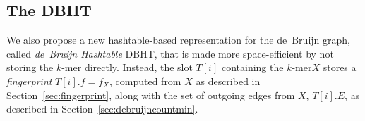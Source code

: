 \documentclass[a4paper,12pt]{article}
\newcommand{\dB}{de~Bruijn\xspace}
\newcommand{\dBG}{de~Bruijn graph\xspace}
\newcommand{\dBCM}{DBCM\xspace}
\newcommand{\dBHT}{DBHT\xspace}
\newcommand{\kmer}{\mbox{$k$-mer}\xspace}
\newcommand{\kmers}{\mbox{$k$-mers}\xspace}
\newcommand{\keyterm}[1]{\textit{#1}\/\xspace}
\newcommand{\strsetname}[1]{\ensuremath{\mathcal{\uppercase{#1}}}}
\begin{document}


\subsection{The DBHT}
\label{sec:debruijnhashtable}

We also propose a new hashtable-based representation for the \dBG, called \keyterm{\dB Hashtable} \dBHT, that is made more space-efficient by not storing the \kmer directly. Instead, the slot $T[i]$ containing the \kmer $X$ stores a \keyterm{fingerprint} $T[i].f = f_X$, computed from $X$ as described in Section~\ref{sec:fingerprint}, along with the set of outgoing edges from $X$, $T[i].E$,  as described in Section~\ref{sec:debruijncountmin}.
\end{document}
